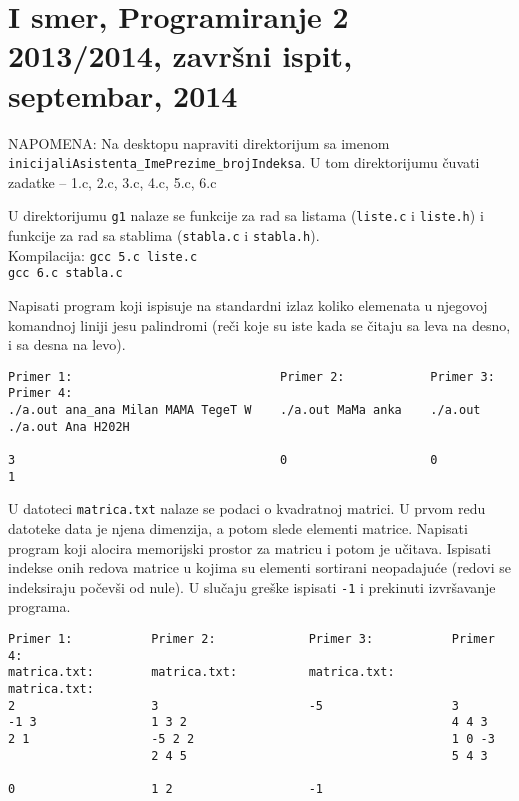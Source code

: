 \section{I smer, Programiranje 2 2013/2014, zavr\v{s}ni ispit, septembar, 2014}


NAPOMENA: Na desktopu napraviti direktorijum sa imenom \verb|inicijaliAsistenta_ImePrezime_brojIndeksa|.
U tom direktorijumu \v cuvati zadatke -- 1.c, 2.c, 3.c, 4.c, 5.c, 6.c

\bigskip

U direktorijumu {\tt g1} nalaze se funkcije za rad sa listama ({\tt liste.c} i {\tt liste.h}) i
funkcije za rad sa stablima ({\tt stabla.c} i {\tt stabla.h}).  \\
Kompilacija: {\tt gcc 5.c liste.c} \\
             {\tt gcc 6.c stabla.c}

\bigskip

\begin{z}
Napisati program koji ispisuje na standardni izlaz koliko elemenata u njegovoj komandnoj liniji jesu palindromi
(re\v ci koje su iste kada se \v citaju sa leva na desno, i sa desna na levo).
\end{z}
\begin{verbatim}
Primer 1:                             Primer 2:            Primer 3:    Primer 4:
./a.out ana_ana Milan MAMA TegeT W    ./a.out MaMa anka    ./a.out      ./a.out Ana H202H

3                                     0                    0            1
\end{verbatim}

\begin{z}
U datoteci {\tt matrica.txt} nalaze se podaci o kvadratnoj matrici. U prvom redu datoteke data je njena
dimenzija, a potom slede elementi matrice. Napisati program koji alocira memorijski prostor za matricu
i potom je u\v citava. Ispisati indekse onih redova matrice u kojima su elementi
sortirani neopadaju\'ce (redovi se indeksiraju po\v cev\v si od nule).
U slu\v caju gre\v ske ispisati {\tt -1} i prekinuti izvr\v savanje programa.
\end{z}
\begin{verbatim}
Primer 1:           Primer 2:             Primer 3:           Primer 4:
matrica.txt:        matrica.txt:          matrica.txt:        matrica.txt:
2                   3                     -5                  3
-1 3                1 3 2                                     4 4 3
2 1                 -5 2 2                                    1 0 -3
                    2 4 5                                     5 4 3

0                   1 2                   -1
\end{verbatim}

